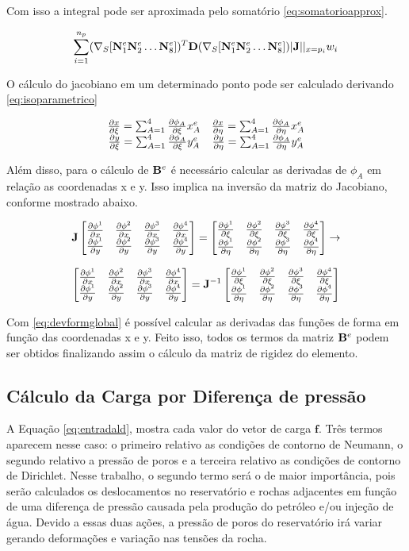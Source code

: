 Com isso a integral pode ser aproximada pelo somatório \eqref{eq:somatorioapprox}.

\begin{equation} \label{eq:somatorioapprox}
    \sum^{n_p}_{i=1} (\sopnabla [\basefunctionelem[1] \basefunctionelem[2] \hdots \basefunctionelem[8] ]) ^T \mathbf{D} (\sopnabla [\basefunctionelem[1] \basefunctionelem[2] \hdots \basefunctionelem[8]])|\mathbf{J}||_{x=p_i} w_i
\end{equation}

O cálculo do jacobiano em um determinado ponto pode ser calculado derivando  \eqref{eq:isoparametrico}

\begin{equation}\label{eq:jacobianoderivadas}
\begin{matrix}
\dxi[x] = \sum^4_{A=1} \dxi[\phi_A] x^e_A &  \deta[x] = \sum^4_{A=1} \deta[\phi_A] x^e_A\\
\dxi[y] = \sum^4_{A=1} \dxi[\phi_A] y^e_A &  \deta[y] = \sum^4_{A=1} \deta[\phi_A] y^e_A
\end{matrix}
\end{equation}


Além disso, para o cálculo de $\bee$ é necessário calcular as derivadas de $\phi_A$ em relação as coordenadas x e y.  Isso implica na inversão da matriz do Jacobiano, conforme mostrado abaixo.


\begin{equation}
\mathbf{J} \deriv = \der \rightarrow
\end{equation}

\begin{equation} \label{eq:devformglobal}
     \deriv = \mathbf{J} ^{-1}\der
\end{equation}

Com \eqref{eq:devformglobal}  é possível calcular as derivadas das funções de forma em função das coordenadas x e y. Feito isso, todos os termos da matriz $\bee$ podem ser obtidos finalizando assim o cálculo da matriz de rigidez do elemento.



\subsection{Cálculo da Carga por Diferença de pressão}

A Equação \eqref{eq:entradald}, mostra cada valor do vetor de carga $\mathbf{f}$. Três termos aparecem nesse caso: o primeiro relativo as condições de contorno de Neumann, o segundo relativo a pressão de poros e a terceira relativo as condições de contorno de Dirichlet. Nesse trabalho, o segundo termo será o de maior importância, pois serão calculados os deslocamentos no reservatório e rochas adjacentes em função de uma diferença de pressão causada pela produção do petróleo e/ou injeção de água. Devido a essas duas ações, a pressão de poros do reservatório irá variar gerando deformações e variação nas tensões da rocha.

